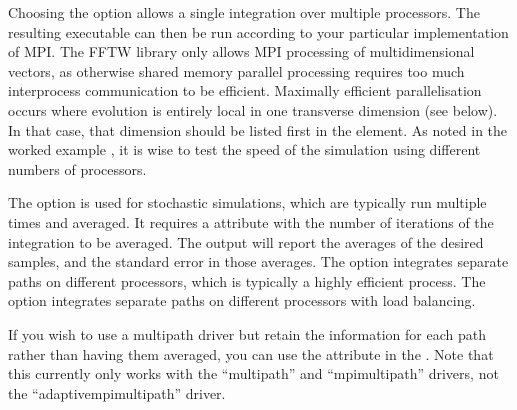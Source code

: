 \documentclass[letterpaper,10pt,english]{sphinxmanual}
\begin{document}
\sphinxAtStartPar
Choosing the  option allows a single integration over multiple processors.  The resulting executable can then be run according to your particular implementation of MPI.  The FFTW library only allows MPI processing of multidimensional vectors, as otherwise shared memory parallel processing requires too much inter\sphinxhyphen{}process communication to be efficient.  Maximally efficient parallelisation occurs where evolution is entirely local in one transverse dimension (see {\hyperref[\detokenize{reference_elements:transversedimensionselement}]{}} below).  In that case, that dimension should be listed first in the {\hyperref[\detokenize{reference_elements:geometryelement}]{}} element.  As noted in the worked example {\hyperref[\detokenize{worked_examples:wignerarguments}]{}}, it is wise to test the speed of the simulation using different numbers of processors.

\sphinxAtStartPar
The  option is used for stochastic simulations, which are typically run multiple times and averaged.  It requires a  attribute with the number of iterations of the integration to be averaged.  The output will report the averages of the desired samples, and the standard error in those averages.
The  option integrates separate paths on different processors, which is typically a highly efficient process.
The  option integrates separate paths on different processors with load balancing.

\sphinxAtStartPar
If you wish to use a multi\sphinxhyphen{}path driver but retain the information for each path rather than having them averaged, you can use the  attribute in the {\hyperref[\detokenize{reference_elements:samplinggroupelement}]{}}. Note that this currently only works with the “multi\sphinxhyphen{}path” and “mpi\sphinxhyphen{}multi\sphinxhyphen{}path” drivers, not the “adaptive\sphinxhyphen{}mpi\sphinxhyphen{}multi\sphinxhyphen{}path” driver.
\end{document}
